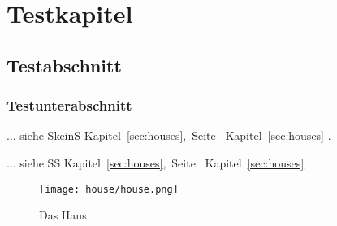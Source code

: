 \documentclass[12pt,a4paper]{scrbook}
\newcommand{\Kap}[2][keinS]{%
	\def\varX{S}%
	\def\varY{#1}%
	\if\varX\varY%
	Kapitel~\ref{#2},~Seite~\pageref{#2}%
	\else%
	Kapitel~\ref{#2}
	\fi
}
\begin{document}
\chapter{Testkapitel}
\section{Testabschnitt}
\subsection{Testunterabschnitt}
\clearpage

... siehe \Kap{sec:houses}.

... siehe \Kap[S]{sec:houses}.

\clearpage
\begin{figure}[htb]
	\centering
	\texttt{[image: house/house.png]}
	\caption{Das Haus}
	\label{fig:house}
\end{figure}
\label{sec:houses}
\end{document}
